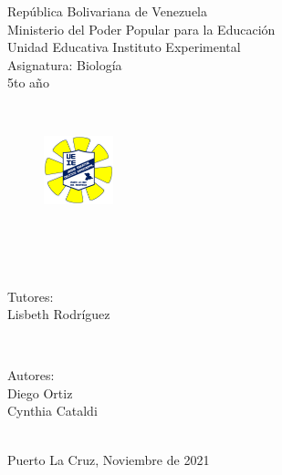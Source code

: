\begin{titlepage}
\newcommand{\HRule}{\rule{\linewidth}{0.5mm}}
\begin{center}
\normalsize República Bolivariana de Venezuela\\[0.1cm] 
\normalsize Ministerio del Poder Popular para la Educación\\[0.1cm]
\normalsize Unidad Educativa Instituto Experimental\\[0.1cm] 
\normalsize Asignatura: Biología\\[0.1cm] 
\normalsize 5to año\\[0.1cm] 
\end{center}
\center 
\quad\\[0.1cm]
\begin{figure}[h]
\centering
\includegraphics[width=2cm]{title/logo.png}
\end{figure}
\quad\\[0.1cm]
\makeatletter
{ \huge \bfseries \@title}\\[0.5cm]
\quad\\[0.9cm]

\vspace*{1cm}
\begin{minipage}{0.4\textwidth}
\begin{flushleft} \large
\normalsize{
\textup{Tutores:}\\
\textup{Lisbeth Rodríguez}
}
\end{flushleft}
\end{minipage}
~
\begin{minipage}{0.4\textwidth}
\begin{flushright} \large
\normalsize{
\textup{Autores:} \\
Diego Ortiz\\
Cynthia Cataldi
}
\end{flushright}
\end{minipage}\\[3cm]
\makeatother
\mbox{}
\vfill
\normalsize Puerto La Cruz, Noviembre de 2021
\end{titlepage}

